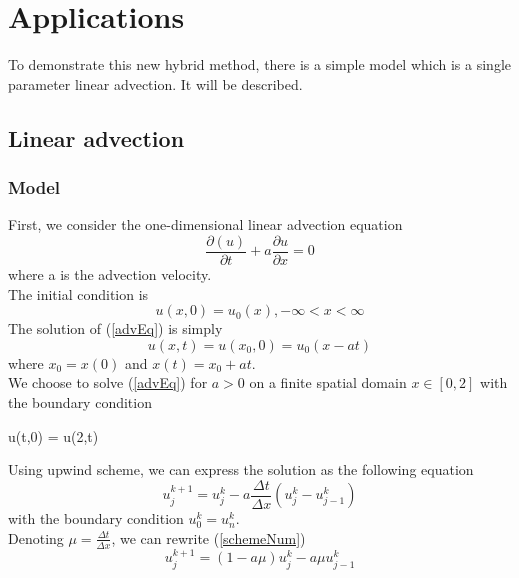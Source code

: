 \documentclass[a4,12pt]{article}
\numberwithin{equation}{section}
\begin{document}
\section{Applications}
To demonstrate this new hybrid method, there is a simple model which is a single parameter linear advection. It will be described.
\subsection{Linear advection}
\subsubsection{Model}
First, we consider the one-dimensional linear advection equation
\begin{equation}
\frac{\partial(u)}{\partial t} + a \frac{\partial u}{ \partial x} = 0  
\label{advEq}
\end{equation}
where a is the advection velocity.\\
The initial condition is 
\begin{equation}
u(x,0) = u_0(x)  , -\infty < x < \infty
\end{equation}
The solution of (\ref{advEq}) is simply 
\begin{equation}
u(x,t) = u(x_0,0) = u_0(x-at)
\label{solAdv}
\end{equation}
where $x_0 = x(0)$ and $x(t) = x_0 + at$. \\
We choose to solve (\ref{advEq}) for $a>0$ on a finite spatial domain $x \in [0,2]$ with the boundary condition 
\begin{center}
    u(t,0) = u(2,t) 
\end{center}
Using upwind scheme, we can express the solution as the following equation
\begin{equation}
u_j^{k+1} = u_j^k - a\frac{\Delta t} {\Delta x} ( u_j^k - u_{j-1}^k) 
\label{schemeNum}
\end{equation}
with the boundary condition $u_0^k = u_n^k$. \\
Denoting $\mu = \frac{\Delta t} {\Delta x} $, we can rewrite  (\ref{schemeNum})
\begin{equation}
u_j^{k+1} = (1- a\mu)  u_j^k - a\mu u_{j-1}^k 
\label{SimplNum}
\end{equation}


\end{document}
